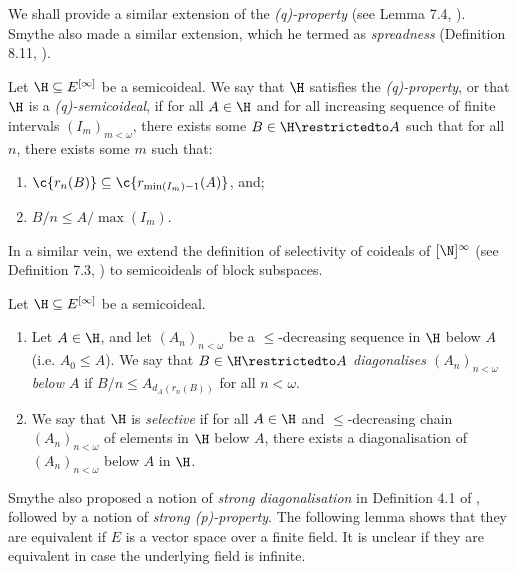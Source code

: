 \documentclass[11pt,reqno]{amsart}
\begin{document}
We shall provide a similar extension of the \emph{(q)-property} (see Lemma 7.4, \cite{T10}). Smythe also made a similar extension, which he termed as \emph{spreadness} (Definition 8.11, \cite{S18}).

\begin{definition}
\label{def:(q)-semicoideal}
    Let $\H \subseteq E^{[\infty]}$ be a semicoideal. We say that $\H$ satisfies the \emph{(q)-property}, or that $\H$ is a \emph{(q)-semicoideal}, if for all $A \in \H$ and for all increasing sequence of finite intervals $(I_m)_{m<\omega}$, there exists some $B \in \H\restrictedto A$ such that for all $n$, there exists some $m$ such that:
    \begin{enumerate}
        \item $\c{r_n(B)} \subseteq \c{r_{\min(I_m)-1}(A)}$, and;

        \item $B/n \leq A/\max(I_m)$.
    \end{enumerate}
\end{definition}

In a similar vein, we extend the definition of selectivity of coideals of $[\N]^\infty$ (see Definition 7.3, \cite{T10}) to semicoideals of block subspaces.

\begin{definition}
\label{def:selective}
    Let $\H \subseteq E^{[\infty]}$ be a semicoideal.
    \begin{enumerate}
        \item Let $A \in \H$, and let $(A_n)_{n<\omega}$ be a $\leq$-decreasing sequence in $\H$ below $A$ (i.e. $A_0 \leq A$). We say that $B \in \H\restrictedto A$ \emph{diagonalises $(A_n)_{n<\omega}$ below $A$} if $B/n \leq A_{d_A(r_n(B))}$ for all $n < \omega$.

        \item We say that $\H$ is \emph{selective} if for all $A \in \H$ and $\leq$-decreasing chain $(A_n)_{n<\omega}$ of elements in $\H$ below $A$, there exists a diagonalisation of $(A_n)_{n<\omega}$ below $A$ in $\H$. 
    \end{enumerate}
\end{definition}

Smythe also proposed a notion of \emph{strong diagonalisation} in Definition 4.1 of \cite{S18}, followed by a notion of \emph{strong (p)-property}. The following lemma shows that they are equivalent if $E$ is a vector space over a finite field. It is unclear if they are equivalent in case the underlying field is infinite.
\end{document}
